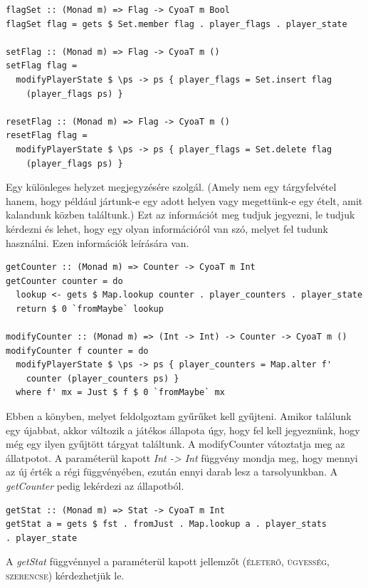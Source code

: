 \documentclass[12pt,a4paper,oneside]{report}
\newcommand{\stat}{\textsc}
\begin{document}
    \begin{verbatim}
flagSet :: (Monad m) => Flag -> CyoaT m Bool
flagSet flag = gets $ Set.member flag . player_flags . player_state

setFlag :: (Monad m) => Flag -> CyoaT m ()
setFlag flag =
  modifyPlayerState $ \ps -> ps { player_flags = Set.insert flag
    (player_flags ps) }

resetFlag :: (Monad m) => Flag -> CyoaT m ()
resetFlag flag =
  modifyPlayerState $ \ps -> ps { player_flags = Set.delete flag
    (player_flags ps) }
    \end{verbatim}
    Egy különleges helyzet megjegyzésére szolgál. (Amely nem egy
    tárgyfelvétel hanem, hogy például jártunk-e egy adott helyen vagy
    megettünk-e egy ételt, amit kalandunk közben találtunk.) Ezt az
    információt meg tudjuk jegyezni, le tudjuk kérdezni és lehet, hogy
    egy olyan információról van szó, melyet fel tudunk használni. Ezen
    információk leírására van.

    \begin{verbatim}
getCounter :: (Monad m) => Counter -> CyoaT m Int
getCounter counter = do
  lookup <- gets $ Map.lookup counter . player_counters . player_state
  return $ 0 `fromMaybe` lookup

modifyCounter :: (Monad m) => (Int -> Int) -> Counter -> CyoaT m ()
modifyCounter f counter = do
  modifyPlayerState $ \ps -> ps { player_counters = Map.alter f'
    counter (player_counters ps) }
  where f' mx = Just $ f $ 0 `fromMaybe` mx
    \end{verbatim}
    Ebben a könyben, melyet feldolgoztam gyűrűket kell
    gyűjteni. Amikor találunk egy újabbat, akkor változik a játékos
    állapota úgy, hogy fel kell jegyeznünk, hogy még egy ilyen
    gyűjtött tárgyat találtunk. A modifyCounter vátoztatja meg az
    állatpotot. A paraméterül kapott \emph{Int -> Int} függvény mondja meg,
    hogy mennyi az új érték a régi függvényében, ezután ennyi darab
    lesz a tarsolyunkban. A \emph{getCounter} pedig lekérdezi az állapotból.

    \begin{verbatim}
getStat :: (Monad m) => Stat -> CyoaT m Int
getStat a = gets $ fst . fromJust . Map.lookup a . player_stats
. player_state
    \end{verbatim}
    A \emph{getStat} függvénnyel a paraméterül kapott jellemzőt (\stat{életerő},
    \stat{ügyesség}, \stat{szerencse}) kérdezhetjük le.
\end{document}
